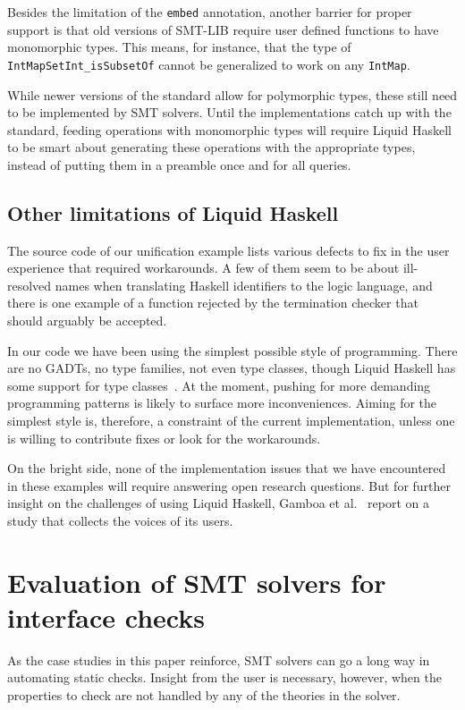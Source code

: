 \documentclass[sigconf, anonymous, review]{acmart}
\newcommand{\tc}[1]{{\small\texttt{#1}}}
\begin{document}
Besides the limitation of the \tc{embed} annotation, another barrier for
proper support is that old versions of SMT-LIB require user defined
functions to have monomorphic types. This means, for instance, that
the type of \tc{IntMapSetInt\_isSubsetOf} cannot be generalized to work
on any \tc{IntMap}.

While newer versions of the standard allow
for polymorphic types, these still need to be implemented by SMT solvers.
Until the implementations catch up with the standard, feeding operations with
monomorphic types will require Liquid Haskell to be smart about generating
these operations with the appropriate types, instead of putting them in a
preamble once and for all queries.


\subsection{Other limitations of Liquid Haskell}
\label{limitations-of-liquid-haskell}

The source code of our unification example lists various defects to fix
in the user experience that required workarounds. A few of them seem to
be about ill-resolved names when translating Haskell identifiers to the
logic language, and there is one example of a function rejected by the
termination checker that should arguably be accepted.

In our code we have been using the simplest possible style of programming.
There are no GADTs, no type families, not even type classes, though
Liquid Haskell has some support for type classes~\cite{liu20}. At the moment,
pushing for more demanding programming patterns is likely to surface more
inconveniences. Aiming for the simplest style is, therefore, a constraint of
the current implementation, unless one is willing to contribute fixes or
look for the workarounds.

On the bright
side, none of the implementation issues that we have encountered in these
examples will require answering open research questions.
But for further insight on the challenges of using Liquid Haskell,
Gamboa et al.~\cite{gamboa25} report on a study that collects the voices
of its users.

\section{Evaluation of SMT solvers for interface checks}
\label{SMT-solvers-for-interface-checks}

As the case studies in this paper reinforce, SMT solvers can go a long way in
automating static checks. Insight from the user is necessary, however,
when the properties to check are not handled by any of the theories in the
solver.
\end{document}
